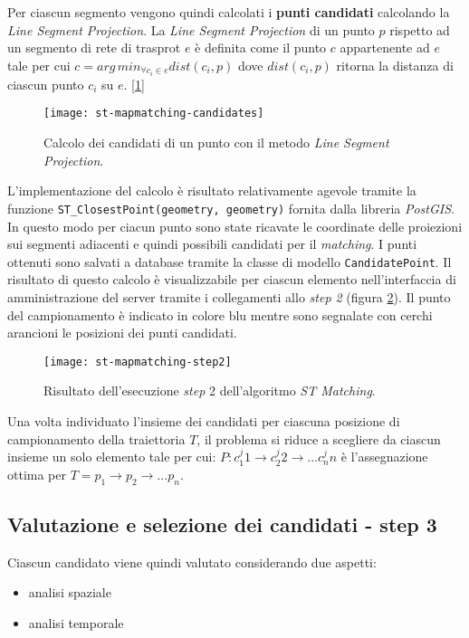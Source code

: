 Per ciascun segmento vengono quindi calcolati i \textbf{punti candidati} calcolando la \emph{Line Segment Projection}. La \emph{Line Segment Projection} di un punto $p$ rispetto ad un segmento di rete di trasprot $e$ è definita come il punto $c$ appartenente ad $e$ tale per cui $c=arg\, min_{\forall c_i \in e} dist(c_i, p)$ dove $dist(c_i, p)$ ritorna la distanza di ciascun punto $c_i$ su $e$. [\ref{fig:st-mapmatching-candidates}]

\begin{figure}[h]
  \centering
  \texttt{[image: st-mapmatching-candidates]}
  \caption{\footnotesize{Calcolo dei candidati di un punto con il metodo \emph{Line Segment Projection}.}}
  \label{fig:st-mapmatching-candidates}
\end{figure}

L'implementazione del calcolo è risultato relativamente agevole tramite la funzione \texttt{ST\_ClosestPoint(geometry, geometry)} fornita dalla libreria \emph{PostGIS}. In questo modo per ciacun punto sono state ricavate le coordinate delle proiezioni sui segmenti adiacenti e quindi possibili candidati per il \emph{matching}. I punti ottenuti sono salvati a database tramite la classe di modello \texttt{CandidatePoint}. Il risultato di questo calcolo è visualizzabile per ciascun elemento nell'interfaccia di amministrazione del server tramite i collegamenti allo \emph{step 2} (figura \ref{fig:st-mapmatching-step2}). Il punto del campionamento è indicato in colore blu mentre sono segnalate con cerchi arancioni le posizioni dei punti candidati.

\begin{figure}[h]
  \centering
  \texttt{[image: st-mapmatching-step2]}
  \caption{\footnotesize{Risultato dell'esecuzione \emph{step} 2 dell'algoritmo \emph{ST Matching}.}}
  \label{fig:st-mapmatching-step2}
\end{figure}

Una volta individuato l'insieme dei candidati per ciascuna posizione di campionamento della traiettoria $T$, il problema si riduce a scegliere da ciascun insieme un solo elemento tale per cui: $P: c_1^j1 \rightarrow c_2^j2 \rightarrow ... c_n^jn$ è l'assegnazione ottima per $T=p_1 \rightarrow p_2 \rightarrow ... p_n$.

\subsection{Valutazione e selezione dei candidati - step 3}
Ciascun candidato viene quindi valutato considerando due aspetti:
\begin{itemize}
  \item analisi spaziale
  \item analisi temporale
\end{itemize}

